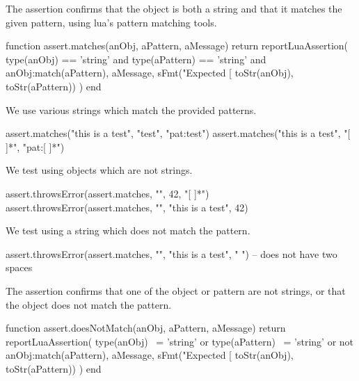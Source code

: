 \stopTestSuite


The  assertion confirms that the object is both a 
string and that it matches the given pattern, using lua's pattern matching 
tools. 

\startLuaCode
function assert.matches(anObj, aPattern, aMessage)
  return reportLuaAssertion(
    type(anObj) == 'string' and type(aPattern) == 'string' 
    and anObj:match(aPattern),
    aMessage,
    sFmt("Expected [%
      toStr(anObj), toStr(aPattern))
  )
end
\stopLuaCode


We use various strings which match the provided patterns. 

\startLuaTest
  assert.matches("this is a test", "test", "pat:test")
  assert.matches("this is a test", "[ ]*", "pat:[ ]*")
\stopLuaTest
\stopTestCase


We test using objects which are not strings.

\startLuaTest
  assert.throwsError(assert.matches, "", 42, "[ ]*")
  assert.throwsError(assert.matches, "",
    "this is a test", 42)
\stopLuaTest
\stopTestCase


We test using a string which does not match the pattern.

\startLuaTest
  assert.throwsError(assert.matches, "", 
    "this is a test", "  ") -- does not have two spaces
\stopLuaTest
\stopTestCase

\stopTestSuite


The  assertion confirms that one of the object 
or pattern are not strings, or that the object does not match the pattern. 

\startLuaCode
function assert.doesNotMatch(anObj, aPattern, aMessage)
  return reportLuaAssertion(
    type(anObj) ~= 'string' or type(aPattern) ~= 'string' 
    or not anObj:match(aPattern),
    aMessage,
    sFmt("Expected [%
      toStr(anObj), toStr(aPattern))
  )
end
\stopLuaCode


